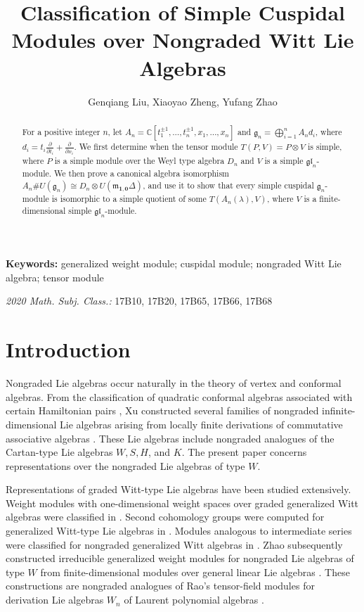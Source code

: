\documentclass[12pt,a4paper]{amsart}
\numberwithin{equation}{section}
\begin{document}
\title[Cuspidal modules]{Classification of Simple Cuspidal Modules over Nongraded Witt Lie Algebras}

\author{Genqiang Liu,
Xiaoyao Zheng, Yufang Zhao
}





\date{}

\begin{abstract}
For a positive integer \(n\), let
$A_n=\mathbb{C}[t_1^{\pm1},\ldots,t_n^{\pm1},x_1,\ldots,x_n]$
and
$\mathfrak{g}_n=\bigoplus_{i=1}^n A_nd_i$,
where \(d_i=t_i\frac{\partial}{\partial t_i}
+\frac{\partial}{\partial x_i}\).
We first determine when the tensor module \(T(P,V)=P\otimes V\) is
simple, where \(P\) is a simple module over the Weyl type algebra \(D_n\) and \(V\) is a simple
\(\mathfrak{gl}_n\)-module. We then prove a canonical algebra isomorphism $A_n\#U(\mathfrak{g}_n)\cong D_n\otimes U(\mathfrak{m}_{\mathbf{1},\mathbf{0}}\Delta)$, and use it
to show that every simple cuspidal \(\mathfrak{g}_n\)-module is
isomorphic to a simple quotient of some
\(T(A_n(\lambda),V)\), where \(V\) is a finite-dimensional simple
\(\mathfrak{gl}_n\)-module.
\end{abstract}

\maketitle

\noindent\textbf{Keywords:} generalized weight module; cuspidal module;
nongraded Witt Lie algebra; tensor module

\vskip 5pt
\noindent
{\em 2020  Math. Subj. Class.:}
17B10, 17B20, 17B65, 17B66, 17B68

\section{Introduction}
Nongraded Lie algebras occur naturally in the theory of vertex and conformal
algebras. From the classification of quadratic conformal algebras associated
with certain Hamiltonian pairs \cite{X3,X4}, Xu constructed several families of
nongraded infinite-dimensional Lie algebras arising from locally finite
derivations of commutative associative algebras \cite{X1,X2}. These Lie algebras include
nongraded analogues of the Cartan-type Lie algebras \(W,S,H\), and \(K\).
The present paper concerns representations over the nongraded Lie algebras of type \(W\).

Representations of graded Witt-type Lie algebras have been studied
extensively. Weight modules with one-dimensional weight
spaces over graded generalized Witt algebras were classified in \cite{ZK}. Second cohomology groups were computed  for generalized
Witt-type Lie algebras in \cite{SZh2}.  Modules analogous to intermediate series  were classified
for nongraded generalized Witt algebras in \cite{SZ1}. Zhao subsequently
constructed irreducible generalized weight modules for nongraded Lie
algebras of type $W$ from finite-dimensional modules over general linear
Lie algebras \cite{Z}. These constructions are nongraded analogues of
Rao's tensor-field modules for derivation Lie algebras $W_n$ of Laurent polynomial
algebras \cite{Ra1,Ra2}.
\end{document}

